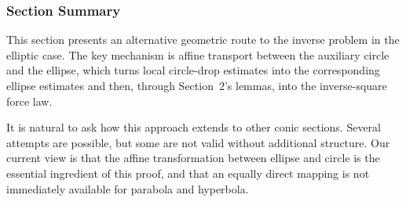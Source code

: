 \subsubsection{Section Summary}
This section presents an alternative geometric route to the inverse problem in the elliptic case. The key mechanism is affine transport between the auxiliary circle and the ellipse, which turns local circle-drop estimates into the corresponding ellipse estimates and then, through Section~2's lemmas, into the inverse-square force law.

It is natural to ask how this approach extends to other conic sections. Several attempts are possible, but some are not valid without additional structure. Our current view is that the affine transformation between ellipse and circle is the essential ingredient of this proof, and that an equally direct mapping is not immediately available for parabola and hyperbola.
